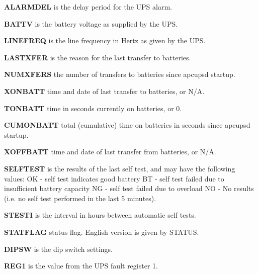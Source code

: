 {{{{{{{{{{{{{{{\begin{description}
\item {\bf ALARMDEL}
is the delay period for the UPS alarm.  

\item {\bf BATTV}
is the battery voltage as supplied by the UPS.  

\item {\bf LINEFREQ}
is the line frequency in Hertz as given by the UPS.  

\item {\bf LASTXFER}
is the reason for the last transfer to batteries.  

\item {\bf NUMXFERS}
the number of transfers to batteries since apcupsd startup.  

\item {\bf XONBATT}
time and date of last transfer to batteries, or N/A.  

\item {\bf TONBATT}
time in seconds currently on batteries, or 0.  

\item {\bf CUMONBATT}
total (cumulative) time on batteries in seconds since apcupsd startup.  

\item {\bf XOFFBATT}
time and date of last transfer from batteries, or N/A.  

\item {\bf SELFTEST}
is the results of the last self test, and may have the following values: OK -
self test indicates good battery BT - self test failed due to insufficient
battery capacity NG - self test failed due to overload NO - No results (i.e.
no self test performed in the last 5 minutes).  

\item {\bf STESTI}
is the interval in hours between automatic self tests.  

\item {\bf STATFLAG}
status flag. English version is given by STATUS.  

\item {\bf DIPSW}
is the dip switch settings.  

\item {\bf REG1}
is the value from the UPS fault register 1.  


\end{description}}}}}}}}}}}}}}}}
